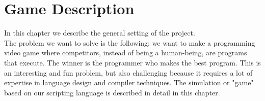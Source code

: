 \chapter{Game Description}
In this chapter we describe the general setting of the project. \\
The problem we want to solve is the following: we want to make a programming video game where competitors, instead of being a human-being, are programs that execute. The winner is the programmer who makes the best program. This is an interesting and fun problem, but also challenging because it requires a lot of expertise in language design and compiler techniques.
The simulation or "game" based on our scripting language is described in detail in this chapter.